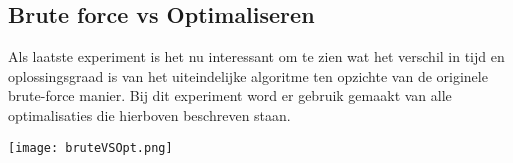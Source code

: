 \documentclass[Main.tex]{subfiles}
\begin{document}
\subsection{Brute force vs Optimaliseren}
Als laatste experiment is het nu interessant om te zien wat het verschil in tijd en oplossingsgraad is van het uiteindelijke algoritme ten opzichte van de originele brute-force manier. Bij dit experiment word er gebruik gemaakt van alle optimalisaties die hierboven beschreven staan.

\begin{center}
\texttt{[image: bruteVSOpt.png]}
\end{center}
\end{document}
